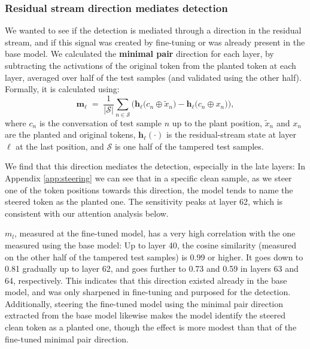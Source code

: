\subsubsection{Residual stream direction mediates detection}
\label{residual-stream-direction}
We wanted to see if the detection is mediated through a direction in the residual stream, and if this signal was created by fine-tuning or was already present in the base model. We calculated the \textbf{minimal pair} direction for each layer, by subtracting the activations of the original token from the planted token at each layer, averaged over half of the test samples (and validated using the other half). Formally, it is calculated using:
\begin{equation}
  \mathbf{m}_\ell \;=\; \frac{1}{|\mathcal{S}|} \sum_{n \in \mathcal{S}}
  \Big( \mathbf{h}_\ell\big(c_n \oplus \tilde{x}_n\big) - \mathbf{h}_\ell\big(c_n \oplus x_n\big) \Big),
  \label{eq:minimal-pair}
\end{equation}
where $c_n$ is the conversation of test sample $n$ up to the plant position, $\tilde{x}_n$ and $x_n$ are the planted and original tokens, $\mathbf{h}_\ell(\cdot)$ is the residual-stream state at layer $\ell$ at the last position, and $\mathcal{S}$ is one half of the tampered test samples.

We find that this direction mediates the detection, especially in the late layers: In Appendix \ref{app:steering} we can see that in a specific clean sample, as we steer one of the token positions towards this direction, the model tends to name the steered token as the planted one. The sensitivity peaks at layer 62, which is consistent with our attention analysis below.

$m_l$, measured at the fine-tuned model, has a very high correlation with the one measured using the base model: Up to layer 40, the cosine similarity (measured on the other half of the tampered test samples) is 0.99 or higher. It goes down to 0.81 gradually up to layer 62, and goes further to 0.73 and 0.59 in layers 63 and 64, respectively. This indicates that this direction existed already in the base model, and was only sharpened in fine-tuning and purposed for the detection. Additionally, steering the fine-tuned model using the minimal pair direction extracted from the base model likewise makes the model identify the steered clean token as a planted one, though the effect is more modest than that of the fine-tuned minimal pair direction.

